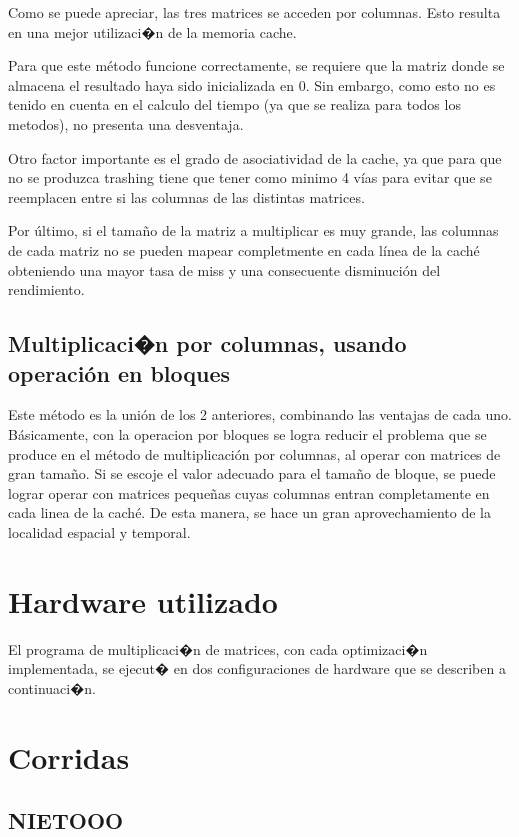 \documentclass{article}
\begin{document}
Como se puede apreciar, las tres matrices se acceden por columnas. Esto resulta en una mejor utilizaci�n de la memoria cache.

Para que este método funcione correctamente, se requiere que la matriz donde se almacena el resultado haya sido inicializada en 0. Sin embargo, como esto no es tenido en cuenta en el calculo del tiempo (ya que se realiza para todos los metodos), no presenta una desventaja.

Otro factor importante es el grado de asociatividad de la cache, ya que para que no se produzca trashing tiene que tener como minimo 4 vías para evitar que se reemplacen entre si las columnas de las distintas matrices.

Por último, si el tamaño de la matriz a multiplicar es muy grande, las columnas de cada matriz no se pueden mapear completmente en cada línea de la caché obteniendo una mayor tasa de miss y una consecuente disminución del rendimiento.

\subsection{Multiplicaci�n por columnas, usando operación en bloques}

Este método es la unión de los 2 anteriores, combinando las ventajas de cada uno. Básicamente, con la operacion por bloques se logra reducir el problema que se produce en el método de multiplicación por columnas, al operar con matrices de gran tamaño. Si se escoje el valor adecuado para el tamaño de bloque, se puede lograr operar con matrices pequeñas cuyas columnas entran completamente en cada linea de la caché. De esta manera, se hace un gran aprovechamiento de la localidad espacial y temporal.

\section{Hardware utilizado}

El programa de multiplicaci�n de matrices, con cada optimizaci�n implementada, se ejecut� en dos configuraciones de hardware que se describen a continuaci�n.

\section{Corridas}

\subsection{NIETOOO}
\end{document}
